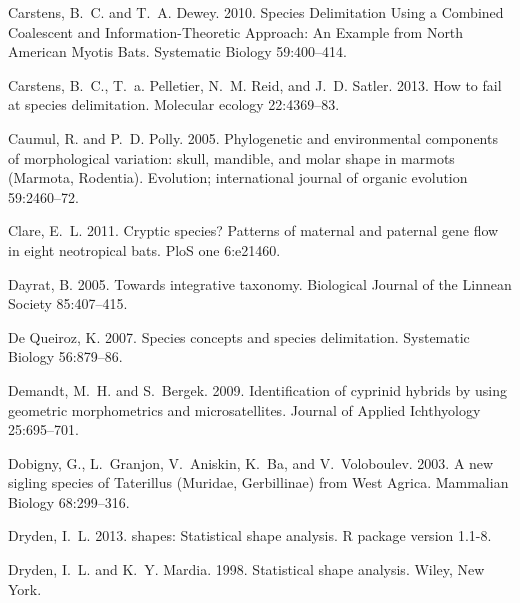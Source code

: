 \documentclass[12pt,letterpaper]{article}
\begin{document}
\begin{thebibliography}{77}
Carstens, B.~C. and T.~A. Dewey. 2010. {Species Delimitation Using a Combined
  Coalescent and Information-Theoretic Approach: An Example from North American
  Myotis Bats}. Systematic Biology 59:400--414.

Carstens, B.~C., T.~a. Pelletier, N.~M. Reid, and J.~D. Satler. 2013. {How to
  fail at species delimitation.} Molecular ecology 22:4369--83.

Caumul, R. and P.~D. Polly. 2005. {Phylogenetic and environmental components of
  morphological variation: skull, mandible, and molar shape in marmots
  (Marmota, Rodentia).} Evolution; international journal of organic evolution
  59:2460--72.

Clare, E.~L. 2011. {Cryptic species? Patterns of maternal and paternal gene
  flow in eight neotropical bats.} PloS one 6:e21460.

Dayrat, B. 2005. {Towards integrative taxonomy}. Biological Journal of the
  Linnean Society 85:407--415.

{De Queiroz}, K. 2007. {Species concepts and species delimitation.} Systematic
  Biology 56:879--86.

Demandt, M.~H. and S.~Bergek. 2009. {Identification of cyprinid hybrids by
  using geometric morphometrics and microsatellites}. Journal of Applied
  Ichthyology 25:695--701.

Dobigny, G., L.~Granjon, V.~Aniskin, K.~Ba, and V.~Voloboulev. 2003. {A new
  sigling species of Taterillus (Muridae, Gerbillinae) from West Agrica}.
  Mammalian Biology 68:299--316.

Dryden, I.~L. 2013. shapes: Statistical shape analysis. R package version
  1.1-8.

Dryden, I.~L. and K.~Y. Mardia. 1998. {Statistical shape analysis}. Wiley, New
  York.


\end{thebibliography}
\end{document}
